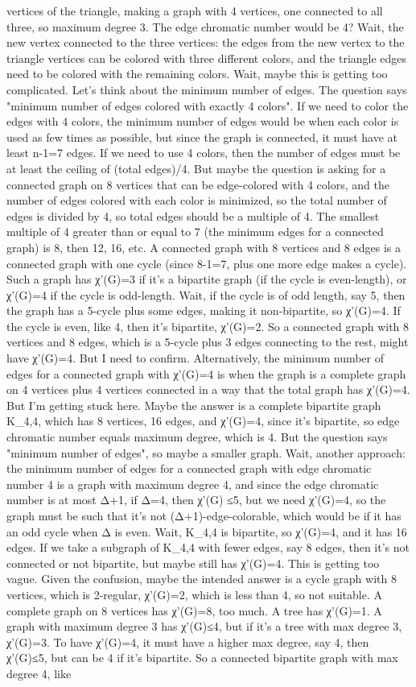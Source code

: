 vertices of the triangle, making a graph with 4 vertices, one connected to all three, so maximum degree 3. The edge chromatic number would be 4? Wait, the new vertex connected to the three vertices: the edges from the new vertex to the triangle vertices can be colored with three different colors, and the triangle edges need to be colored with the remaining colors. Wait, maybe this is getting too complicated. Let's think about the minimum number of edges. The question says "minimum number of edges colored with exactly 4 colors". If we need to color the edges with 4 colors, the minimum number of edges would be when each color is used as few times as possible, but since the graph is connected, it must have at least n-1=7 edges. If we need to use 4 colors, then the number of edges must be at least the ceiling of (total edges)/4. But maybe the question is asking for a connected graph on 8 vertices that can be edge-colored with 4 colors, and the number of edges colored with each color is minimized, so the total number of edges is divided by 4, so total edges should be a multiple of 4. The smallest multiple of 4 greater than or equal to 7 (the minimum edges for a connected graph) is 8, then 12, 16, etc. A connected graph with 8 vertices and 8 edges is a connected graph with one cycle (since 8-1=7, plus one more edge makes a cycle). Such a graph has χ'(G)=3 if it's a bipartite graph (if the cycle is even-length), or χ'(G)=4 if the cycle is odd-length. Wait, if the cycle is of odd length, say 5, then the graph has a 5-cycle plus some edges, making it non-bipartite, so χ'(G)=4. If the cycle is even, like 4, then it's bipartite, χ'(G)=2. So a connected graph with 8 vertices and 8 edges, which is a 5-cycle plus 3 edges connecting to the rest, might have χ'(G)=4. But I need to confirm. Alternatively, the minimum number of edges for a connected graph with χ'(G)=4 is when the graph is a complete graph on 4 vertices plus 4 vertices connected in a way that the total graph has χ'(G)=4. But I'm getting stuck here. Maybe the answer is a complete bipartite graph K_{4,4}, which has 8 vertices, 16 edges, and χ'(G)=4, since it's bipartite, so edge chromatic number equals maximum degree, which is 4. But the question says "minimum number of edges", so maybe a smaller graph. Wait, another approach: the minimum number of edges for a connected graph with edge chromatic number 4 is a graph with maximum degree 4, and since the edge chromatic number is at most Δ+1, if Δ=4, then χ'(G) ≤5, but we need χ'(G)=4, so the graph must be such that it's not (Δ+1)-edge-colorable, which would be if it has an odd cycle when Δ is even. Wait, K_{4,4} is bipartite, so χ'(G)=4, and it has 16 edges. If we take a subgraph of K_{4,4} with fewer edges, say 8 edges, then it's not connected or not bipartite, but maybe still has χ'(G)=4. This is getting too vague. Given the confusion, maybe the intended answer is a cycle graph with 8 vertices, which is 2-regular, χ'(G)=2, which is less than 4, so not suitable. A complete graph on 8 vertices has χ'(G)=8, too much. A tree has χ'(G)=1. A graph with maximum degree 3 has χ'(G)≤4, but if it's a tree with max degree 3, χ'(G)=3. To have χ'(G)=4, it must have a higher max degree, say 4, then χ'(G)≤5, but can be 4 if it's bipartite. So a connected bipartite graph with max degree 4, like 
